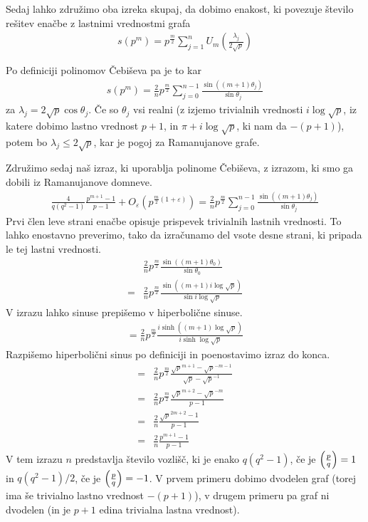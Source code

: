 Sedaj lahko združimo oba izreka skupaj, da dobimo enakost, ki povezuje število rešitev enačbe z lastnimi vrednostmi grafa
\begin{align*}
    s(p^m) = p^{\frac{m}{2}}\sum_{j=1}^n U_m \left(\frac{\lambda_j}{2\sqrt{p}}\right)
\end{align*}

Po definiciji polinomov Čebiševa pa je to kar
\begin{align*}
    s(p^m) = \frac{2}{n} p^\frac{m}{2}\sum_{j=0}^{n-1}\frac{\sin((m+1)\theta_j)}{\sin \theta_j}
\end{align*}
za \(\lambda_j = 2\sqrt{p}\cos\theta_j\). Če so \(\theta_j\) vsi realni (z izjemo trivialnih vrednosti \(i\log\sqrt p\), iz katere dobimo lastno vrednost \(p+1\), in \(\pi + i \log\sqrt{p}\), ki nam da \(-(p+1)\)), potem bo \(\lambda_j \leq 2\sqrt{p}\), kar je pogoj za Ramanujanove grafe. %

Združimo sedaj naš izraz, ki uporablja polinome Čebiševa, z izrazom, ki smo ga dobili iz Ramanujanove domneve.
\begin{align}\label{ramanujanova-domneva-izraz}
    \frac{4}{q(q^2-1)}\frac{p^{m+1}-1}{p-1} + O_\varepsilon \left(p^{\frac{m}{2}(1+\varepsilon)}\right) = \frac{2}{n} p^\frac{m}{2}\sum_{j=0}^{n-1}\frac{\sin((m+1)\theta_j)}{\sin \theta_j}
\end{align}
Prvi člen leve strani enačbe opisuje prispevek trivialnih lastnih vrednosti. To lahko enostavno preverimo, tako da izračunamo del vsote desne strani, ki pripada le tej lastni vrednosti.
\begin{align*}
    &\frac{2}{n} p^\frac{m}{2}\frac{\sin((m+1)\theta_0)}{\sin \theta_0} \\
    =&\frac{2}{n}p^\frac{m}{2}\frac{\sin((m+1)i\log\sqrt p)}{\sin i\log\sqrt p}
\end{align*}
V izrazu lahko sinuse prepišemo v hiperbolične sinuse.
\begin{align*}
    =\frac{2}{n}p^\frac{m}{2}\frac{i\sinh((m+1)\log\sqrt p)}{i\sinh \log\sqrt p}
\end{align*}
Razpišemo hiperbolični sinus po definiciji in poenostavimo izraz do konca.
\begin{align*}
    =&\frac{2}{n}p^\frac{m}{2}\frac{ \sqrt{p}^{m+1} - \sqrt{p}^{-m-1}}{\sqrt{p} - \sqrt{p}^{-1}} \\
    =&\frac{2}{n}p^\frac{m}{2}\frac{ \sqrt{p}^{m+2} - \sqrt{p}^{-m}}{p - 1} \\
    =&\frac{2}{n}\frac{ \sqrt{p}^{2m+2} - 1}{p - 1} \\ 
    =&\frac{2}{n}\frac{ p^{m+1} - 1}{p - 1} 
\end{align*}
V tem izrazu \(n\) predstavlja število vozlišč, ki je enako \(q(q^2-1)\), če je \(\left(\frac{p}{q}\right)=1\) in \(q(q^2-1)/2\), če je \(\left(\frac{p}{q}\right)=-1\). V prvem primeru dobimo dvodelen graf (torej ima še trivialno lastno vrednost \(-(p+1)\)), v drugem primeru pa graf ni dvodelen (in je \(p+1\) edina trivialna lastna vrednost).

